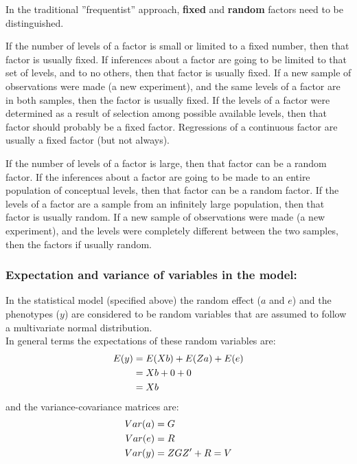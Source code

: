 \documentclass[
]{book}
\begin{document}
In the traditional ''frequentist'' approach, \textbf{fixed} and \textbf{random} factors need
to be distinguished.

If the number of levels of a factor is small or limited to a fixed number, then that
factor is usually fixed.
If inferences about a factor are going to be limited to that set of levels, and to no
others, then that factor is usually fixed.
If a new sample of observations were made (a new experiment), and the same levels
of a factor are in both samples, then the factor is usually fixed.
If the levels of a factor were determined as a result of selection among possible
available levels, then that factor should probably be a fixed factor.
Regressions of a continuous factor are usually a fixed factor (but not always).

If the number of levels of a factor is large, then that factor can be a
random factor.
If the inferences about a factor are going to be made to an entire population of
conceptual levels, then that factor can be a random factor.
If the levels of a factor are a sample from an infinitely large population, then that
factor is usually random.
If a new sample of observations were made (a new experiment), and the levels were
completely different between the two samples, then the factors if usually random.

\hypertarget{expectation-and-variance-of-variables-in-the-model}{%
\subsubsection*{Expectation and variance of variables in the model:}\label{expectation-and-variance-of-variables-in-the-model}}

In the statistical model (specified above) the random effect (\(a\) and \(e\)) and the phenotypes (\(y\)) are considered to be random variables that are assumed to follow a multivariate normal distribution.\\
In general terms the expectations of these random variables are:\\
\begin{align}
E(y) &= E(Xb) + E(Za) + E(e) \notag \\
     &= Xb + 0 + 0 \notag \\
     &= Xb \notag
\end{align}
and the variance-covariance matrices are:
\begin{align}
 Var(a) &= G \notag \\
 Var(e) &= R \notag \\
 Var(y) &= ZGZ' + R = V \notag \\
\end{align}
\end{document}
